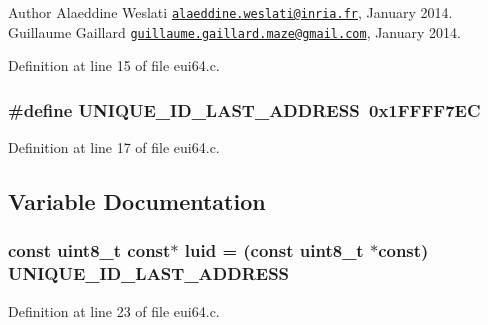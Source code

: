 \begin{DoxyAuthor}{Author}
Alaeddine Weslati \href{mailto:alaeddine.weslati@inria.fr}{\tt alaeddine.\+weslati@inria.\+fr}, January 2014.  Guillaume Gaillard \href{mailto:guillaume.gaillard.maze@gmail.com}{\tt guillaume.\+gaillard.\+maze@gmail.\+com}, January 2014. 
\end{DoxyAuthor}


Definition at line 15 of file eui64.\+c.

\subsubsection[{\texorpdfstring{U\+N\+I\+Q\+U\+E\+\_\+\+I\+D\+\_\+\+L\+A\+S\+T\+\_\+\+A\+D\+D\+R\+E\+SS}{UNIQUE_ID_LAST_ADDRESS}}]{\setlength{\rightskip}{0pt plus 5cm}\#define U\+N\+I\+Q\+U\+E\+\_\+\+I\+D\+\_\+\+L\+A\+S\+T\+\_\+\+A\+D\+D\+R\+E\+SS~0x1\+F\+F\+F\+F7\+EC}\hypertarget{iot-lab___m3_2eui64_8c_ab59ec9c178356b200db5d5f90253b1b9}{}\label{iot-lab___m3_2eui64_8c_ab59ec9c178356b200db5d5f90253b1b9}


Definition at line 17 of file eui64.\+c.



\subsection{Variable Documentation}
\subsubsection[{\texorpdfstring{luid}{luid}}]{\setlength{\rightskip}{0pt plus 5cm}const {\bf uint8\+\_\+t} const$\ast$ luid = (const {\bf uint8\+\_\+t} $\ast$const) {\bf U\+N\+I\+Q\+U\+E\+\_\+\+I\+D\+\_\+\+L\+A\+S\+T\+\_\+\+A\+D\+D\+R\+E\+SS}}\hypertarget{iot-lab___m3_2eui64_8c_abb80a3bafe316fa88843c9124c8c5783}{}\label{iot-lab___m3_2eui64_8c_abb80a3bafe316fa88843c9124c8c5783}


Definition at line 23 of file eui64.\+c.

